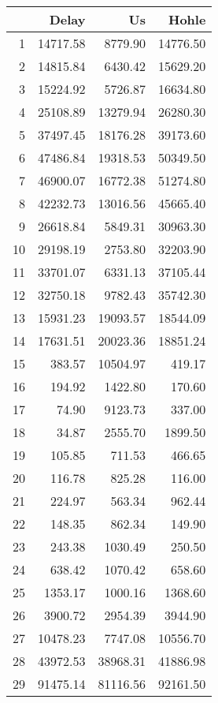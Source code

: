 \begin{table}[ht]
\centering
\begin{tabular}{rrrr}
  \hline
 & Delay & Us & Hohle \\ 
  \hline
1 & 14717.58 & 8779.90 & 14776.50 \\ 
  2 & 14815.84 & 6430.42 & 15629.20 \\ 
  3 & 15224.92 & 5726.87 & 16634.80 \\ 
  4 & 25108.89 & 13279.94 & 26280.30 \\ 
  5 & 37497.45 & 18176.28 & 39173.60 \\ 
  6 & 47486.84 & 19318.53 & 50349.50 \\ 
  7 & 46900.07 & 16772.38 & 51274.80 \\ 
  8 & 42232.73 & 13016.56 & 45665.40 \\ 
  9 & 26618.84 & 5849.31 & 30963.30 \\ 
  10 & 29198.19 & 2753.80 & 32203.90 \\ 
  11 & 33701.07 & 6331.13 & 37105.44 \\ 
  12 & 32750.18 & 9782.43 & 35742.30 \\ 
  13 & 15931.23 & 19093.57 & 18544.09 \\ 
  14 & 17631.51 & 20023.36 & 18851.24 \\ 
  15 & 383.57 & 10504.97 & 419.17 \\ 
  16 & 194.92 & 1422.80 & 170.60 \\ 
  17 & 74.90 & 9123.73 & 337.00 \\ 
  18 & 34.87 & 2555.70 & 1899.50 \\ 
  19 & 105.85 & 711.53 & 466.65 \\ 
  20 & 116.78 & 825.28 & 116.00 \\ 
  21 & 224.97 & 563.34 & 962.44 \\ 
  22 & 148.35 & 862.34 & 149.90 \\ 
  23 & 243.38 & 1030.49 & 250.50 \\ 
  24 & 638.42 & 1070.42 & 658.60 \\ 
  25 & 1353.17 & 1000.16 & 1368.60 \\ 
  26 & 3900.72 & 2954.39 & 3944.90 \\ 
  27 & 10478.23 & 7747.08 & 10556.70 \\ 
  28 & 43972.53 & 38968.31 & 41886.98 \\ 
  29 & 91475.14 & 81116.56 & 92161.50 \\ 

\end{tabular}
\end{table}
